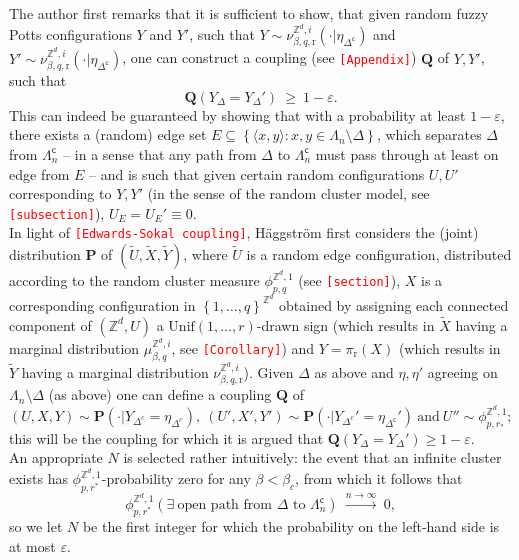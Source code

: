 \documentclass[12pt]{article}
\newcommand{\PP}{\mathbf{P}}
\newcommand{\Q}{\mathbf{Q}}
\renewcommand{\r}{\mathrm{r}}
\newcommand{\Z}{\mathbb{Z}}
\newcommand{\set}[1]{\left\{#1\right\}}
\newcommand{\ra}{\rightarrow}
\newcommand{\pika}{\boldsymbol{\cdot}}
\newcommand{\1}{\mathbbm{1}}
\renewcommand{\sp}[1]{\langle #1\rangle}
\renewcommand{\c}{\mathsf{c}}
\newcommand{\5}{\vspace{0.5cm}}
\renewcommand{\tilde}{\widetilde}
\theoremstyle{definition}
\begin{document}
The author first remarks that it is sufficient to show, that given random fuzzy Potts configurations $Y$ and $Y'$, such that $Y\sim\nu_{\beta,q,\r}^{\Z^d,i}(\pika|\eta_{\Delta^\c})$ and $Y'\sim\nu_{\beta,q,\r}^{\Z^d,i}(\pika|\eta_{\Delta^\c})$, one can construct a coupling (see \textcolor{red}{\texttt{[Appendix]}}) $\Q$ of $Y,Y'$, such that
$$\Q(Y_{\Delta}=Y_{\Delta}') ~\geq~ 1-\varepsilon.$$
This can indeed be guaranteed by showing that with a probability at least $1-\varepsilon$, there exists a (random) edge set $E\subseteq\set{\sp{x,y}:x,y\in\Lambda_n\setminus\Delta}$, which separates $\Delta$ from $\Lambda_n^\c$ -- in a sense that any path from $\Delta$ to $\Lambda_n^\c$ must pass through at least on edge from $E$ -- and is such that given certain random configurations $U,U'$ corresponding to $Y,Y'$ (in the sense of the random cluster model, see \textcolor{red}{\texttt{[subsection]}}), $U_E=U_E'\equiv 0$. \\

In light of \textcolor{red}{\texttt{[Edwards-Sokal coupling]}}, H\"aggstr\"om first considers the (joint) distribution $\PP$ of $(\tilde{U},\tilde{X},\tilde{Y})$, where $\tilde{U}$ is a random edge configuration, distributed according to the random cluster measure $\phi_{p,q}^{\Z^d,1}$ (see \textcolor{red}{\texttt{[section]}}), $X$ is a corresponding configuration in $\set{1,\ldots,q}^{\Z^d}$ obtained by assigning each connected component of $(\Z^d,U)$ a $\mathrm{Unif}(1,\ldots,r)$-drawn sign (which results in $\tilde{X}$ having a marginal distribution $\mu_{\beta,q}^{\Z^d, i}$, see \textcolor{red}{\texttt{[Corollary]}}) and $Y=\pi_\r(X)$ (which results in $\tilde{Y}$ having a marginal distribution $\nu_{\beta,q,\r}^{\Z^d,i}$). Given $\Delta$ as above and $\eta,\eta'$ agreeing on $\Lambda_n\setminus\Delta$ (as above) one can define a coupling $\Q$ of 
$$(U,X,Y)\sim\PP(\pika|Y_{\Delta^c}=\eta_{\Delta^c}),~(U',X',Y')\sim\PP(\pika|Y_{\Delta^c}'=\eta_{\Delta^\c}')~\text{and}~U''\sim\phi_{p,r_*}^{\Z^d,1};$$
this will be the coupling for which it is argued that $\Q(Y_{\Delta}=Y_{\Delta}')\geq 1-\varepsilon$. \\

An appropriate $N$ is selected rather intuitively: the event that an infinite cluster exists has $\phi_{p,r^*}^{\Z^d,1}$-probability zero for any $\beta<\beta_c$, from which it follows that
$$\phi_{p,r^*}^{\Z^d,1}(\exists~\text{open path from $\Delta$ to $\Lambda_n^\c$}) ~\xrightarrow{n\ra\infty}~ 0,$$
so we let $N$ be the first integer for which the probability on the left-hand side is at most $\varepsilon$. \\
\end{document}
